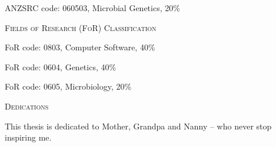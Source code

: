 ANZSRC code: 060503, Microbial Genetics, 20\%
\vspace{2cm}

\begin{center}
\Large \textsc{Fields of Research (FoR) Classification}
\end{center}

FoR code: 0803, Computer Software, 40\%

FoR code: 0604, Genetics, 40\%

FoR code: 0605, Microbiology, 20\%
\afterpage{\null\thispagestyle{empty}\newpage}
\newpage

\thispagestyle{plain}

\begin{center}
\Large \textsc{Dedications}
\end{center}

This thesis is dedicated to Mother, Grandpa and Nanny -- who never stop inspiring me.


\afterpage{\null\thispagestyle{empty}\newpage}
\newpage